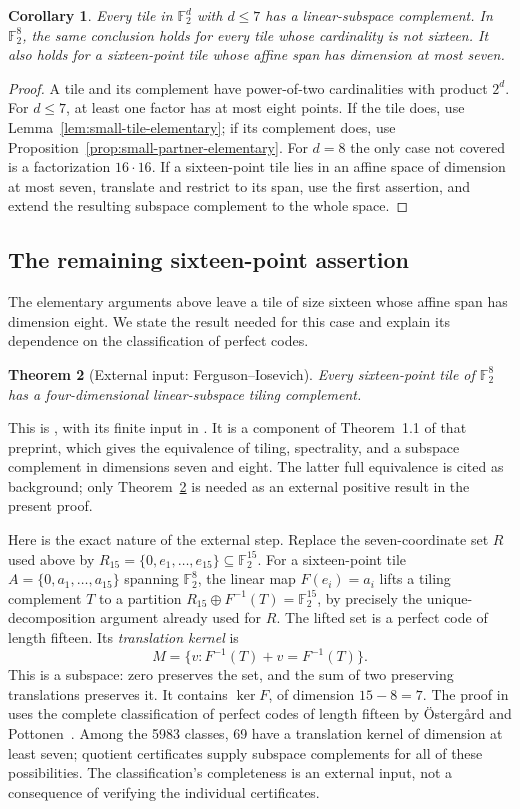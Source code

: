\documentclass[11pt]{article}
\numberwithin{equation}{section}
\newtheorem{theorem}{Theorem}[section]
\newtheorem{corollary}[theorem]{Corollary}
\theoremstyle{definition}
\theoremstyle{remark}\newtheorem{remark}[theorem]{Remark}
\newcommand{\F}{\mathbb F_2}
\begin{document}
\begin{corollary}\label{cor:elementary-positive-range}
Every tile in $\mathbb F_2^d$ with $d\le7$ has a linear-subspace
complement.  In $\mathbb F_2^8$, the same conclusion holds for every
tile whose cardinality is not sixteen.  It also holds for a sixteen-point
tile whose affine span has dimension at most seven.
\end{corollary}
\begin{proof}
A tile and its complement have power-of-two cardinalities with product
$2^d$.  For $d\le7$, at least one factor has at most eight points.
If the tile does, use Lemma~\ref{lem:small-tile-elementary}; if its
complement does, use Proposition~\ref{prop:small-partner-elementary}.
For $d=8$ the only case not covered is a factorization $16\cdot16$.
If a sixteen-point tile lies in an affine space of dimension at most
seven, translate and restrict to its span, use the first assertion, and
extend the resulting subspace complement to the whole space.
\end{proof}


\subsection{The remaining sixteen-point assertion}
The elementary arguments above leave a tile of size sixteen whose affine
span has dimension eight. We state the result needed for this case
and explain its dependence on the classification of perfect codes.

\begin{theorem}[External input: Ferguson--Iosevich]\label{thm:external16}
Every sixteen-point tile of $\F^8$ has a four-dimensional linear-subspace
tiling complement.
\end{theorem}
This is \cite[Lemma~6.5]{FI}, with its finite input in
\cite[Lemma~6.4]{FI}. It is a component of Theorem~1.1 of that preprint, which gives
the equivalence of tiling, spectrality, and a subspace complement in
dimensions seven and eight. The latter full equivalence is cited as
background; only Theorem~\ref{thm:external16} is needed as an external
positive result in the present proof.

Here is the exact nature of the external step. Replace the seven-coordinate
set $R$ used above by $R_{15}=\{0,e_1,\ldots,e_{15}\}\subseteq\F^{15}$.
For a sixteen-point tile $A=\{0,a_1,\ldots,a_{15}\}$ spanning $\F^8$,
the linear map $F(e_i)=a_i$ lifts a tiling complement $T$ to a partition
$R_{15}\oplus F^{-1}(T)=\F^{15}$, by precisely the unique-decomposition
argument already used for $R$. The lifted set is a perfect code of length
fifteen. Its \emph{translation kernel} is
\[
 M=\{v:F^{-1}(T)+v=F^{-1}(T)\}.
\]
This is a subspace: zero preserves the set, and the sum of two preserving
translations preserves it. It contains $\ker F$, of dimension $15-8=7$.
The proof in \cite{FI} uses the complete classification of perfect codes of
length fifteen by \"Osterg\aa rd and Pottonen~\cite{OP}. Among the 5983
classes, 69 have a translation kernel of dimension at least seven; quotient
certificates supply subspace complements for all of these possibilities.
The classification's completeness is an external input, not a consequence
of verifying the individual certificates.
\end{document}
